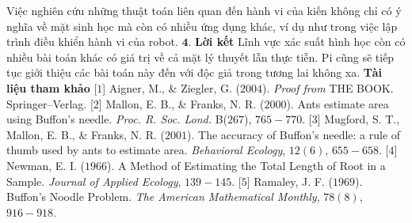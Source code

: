 \begin{multicols}{2}
	\vskip 0.1cm
	Việc nghiên cứu những thuật toán liên quan đến hành vi của kiến không chỉ có ý nghĩa về mặt sinh học mà còn có nhiều ứng dụng khác, ví dụ như trong việc lập trình điều khiển hành vi của robot.
	\vskip 0.1cm
	$\pmb{4.}$ \textbf{\color{toanhocdoisong}Lời kết}
	\vskip 0.1cm
	Lĩnh vực xác suất hình học còn có nhiều bài toán khác có giá trị về cả mặt lý thuyết lẫn thực tiễn. Pi cũng sẽ tiếp tục giới thiệu các bài toán này đến với độc giả trong tương lai không xa.
	\vskip 0.1cm
	\textbf{\color{toanhocdoisong}Tài liệu tham khảo}
	\vskip 0.1cm
	[$1$] Aigner, M., \& Ziegler, G. ($2004$). \textit{Proof from} THE BOOK. Springer--Verlag.
	\vskip 0.1cm
	[$2$] Mallon, E. B., \& Franks, N. R. ($2000$). Ants estimate area using Buffon's needle. \textit{Proc. R. Soc. Lond.} B($267$), $765-770$.
	\vskip 0.1cm
	[$3$] Mugford, S. T., Mallon, E. B., \& Franks, N. R. ($2001$). The accuracy of Buffon's needle: a rule of thumb used by ants to estimate area. \textit{Behavioral Ecology}, $12(6)$, $655-658$.
	\vskip 0.1cm
	[$4$] Newman, E. I. ($1966$). A Method of Estimating the Total Length of Root in a Sample. \textit{Journal of Applied Ecology}, $139-145$.
	\vskip 0.1cm
	[$5$] Ramaley, J. F. ($1969$). Buffon's Noodle Problem. \textit{The American Mathematical Monthly}, $78(8)$, $916-918$.
\end{multicols}